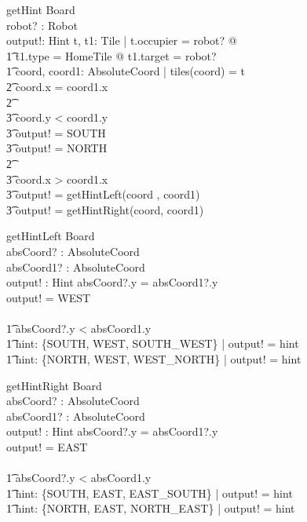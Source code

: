 \documentclass[a4paper,11pt]{article}
\begin{document}
\begin{schema}{getHint}
\Xi Board \\
robot? : Robot \\
output!: Hint
\where
\exists t, t1: Tile | t.occupier = robot? @\\ \t1
t1.type = HomeTile @ t1.target = robot? \\ \t1
\exists coord, coord1: AbsoluteCoord | tiles(coord) = t \\ \t2
\IF coord.x = coord1.x \\ \t2
\THEN \\ \t3
\IF coord.y < coord1.y \\ \t3
\THEN output! = SOUTH \\ \t3
\ELSE output! = NORTH \\ \t2
\ELSE \\ \t3
\IF coord.x > coord1.x \\ \t3
\THEN output! = getHintLeft(coord , coord1) \\ \t3
\ELSE output! = getHintRight(coord, coord1)
\end{schema}

\begin{schema}{getHintLeft}
\Xi Board \\
absCoord? : AbsoluteCoord \\
absCoord1? : AbsoluteCoord \\
output! : Hint 
\where
\IF absCoord?.y = absCoord1?.y \\
\THEN output! = WEST \\
\ELSE \\ \t1
\IF absCoord?.y < absCoord1.y \\ \t1
\THEN \exists hint: \{SOUTH, WEST, SOUTH\_WEST\} | output! = hint \\ \t1
\ELSE \exists hint: \{NORTH, WEST, WEST\_NORTH\} | output! = hint
\end{schema}

\begin{schema}{getHintRight}
\Xi Board \\
absCoord? : AbsoluteCoord \\
absCoord1? : AbsoluteCoord \\
output! : Hint
\where
\IF absCoord?.y = absCoord1?.y \\
\THEN output! = EAST \\
\ELSE \\ \t1
\IF absCoord?.y < absCoord1.y \\ \t1
\THEN \exists hint: \{SOUTH, EAST, EAST\_SOUTH\} | output! = hint \\ \t1
\ELSE \exists hint: \{NORTH, EAST, NORTH\_EAST\} | output! = hint
\end{schema}
\end{document}
